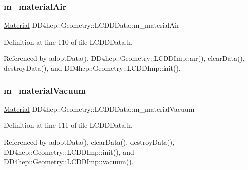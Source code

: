\hypertarget{class_d_d4hep_1_1_geometry_1_1_l_c_d_d_data_ac4e5dcab68ed7a7e7799a5a2ae8705d8}{}\label{class_d_d4hep_1_1_geometry_1_1_l_c_d_d_data_ac4e5dcab68ed7a7e7799a5a2ae8705d8} 
\subsubsection{\texorpdfstring{m\+\_\+material\+Air}{m\_materialAir}}
{\footnotesize\ttfamily \hyperlink{class_d_d4hep_1_1_geometry_1_1_material}{Material} D\+D4hep\+::\+Geometry\+::\+L\+C\+D\+D\+Data\+::m\+\_\+material\+Air\hspace{0.3cm}{\ttfamily [protected]}}



Definition at line 110 of file L\+C\+D\+D\+Data.\+h.



Referenced by adopt\+Data(), D\+D4hep\+::\+Geometry\+::\+L\+C\+D\+D\+Imp\+::air(), clear\+Data(), destroy\+Data(), and D\+D4hep\+::\+Geometry\+::\+L\+C\+D\+D\+Imp\+::init().

\hypertarget{class_d_d4hep_1_1_geometry_1_1_l_c_d_d_data_aa786b32f3e175bacb701cb50f164d144}{}\label{class_d_d4hep_1_1_geometry_1_1_l_c_d_d_data_aa786b32f3e175bacb701cb50f164d144} 
\subsubsection{\texorpdfstring{m\+\_\+material\+Vacuum}{m\_materialVacuum}}
{\footnotesize\ttfamily \hyperlink{class_d_d4hep_1_1_geometry_1_1_material}{Material} D\+D4hep\+::\+Geometry\+::\+L\+C\+D\+D\+Data\+::m\+\_\+material\+Vacuum\hspace{0.3cm}{\ttfamily [protected]}}



Definition at line 111 of file L\+C\+D\+D\+Data.\+h.



Referenced by adopt\+Data(), clear\+Data(), destroy\+Data(), D\+D4hep\+::\+Geometry\+::\+L\+C\+D\+D\+Imp\+::init(), and D\+D4hep\+::\+Geometry\+::\+L\+C\+D\+D\+Imp\+::vacuum().


